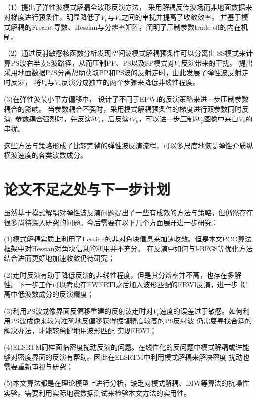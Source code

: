 （1）提出了弹性波模式解耦全波形反演方法，
采用解耦反传波场而非地面数据来对梯度进行预条件，明显降低了$V_p$与$V_s$之间的串扰并提高了收敛效率。
并基于模式解耦的Frechet导数、Hessian与分辨率矩阵，阐明了压制参数trade-off的内在机制。

（2）通过反射敏感核函数分析发现空间波模式解耦预条件可以分离出
SS模式来计算PS波右半支S波路径，从而压制PP、PS以及SP模式对$V_s$反演带来的干扰。
提出采用地面数据P/S分离帮助获取PP和PS波的反射走时，由此发展了弹性波反射走时反演，
将$V_p$与$V_s$反演分成独立的两个步骤来降低非线性程度。

(3)在弹性波最小平方偏移中，
设计了不同于EFWI的反演策略来进一步压制参数耦合的影响。
当参数耦合不强时，采用模式解耦预条件的梯度进行双参数同时反演;
参数耦合强烈时，先反演$\delta V_s$，后反演$\delta V_p$，可以进一步压制$\delta
V_p$图像中来自$V_s$的串扰。

这些方法与策略形成了比较完整的弹性波反演流程，可以多尺度地恢复弹性介质纵横波速度的各类波数成分。

\section{论文不足之处与下一步计划}
虽然基于模式解耦对弹性波反演问题提出了一些有成效的方法与策略，但仍然存在很多尚待深入研究的问题。今后需要在以下几个方面展开进一步研究：

(1)模式解耦实质上利用了Hessian的非对角块信息来加速收敛。但是本文PCG算法框架中对Hessian对角块信息的利用并不充分。
在反演中如何与l-BFGS等优化方法结合进而更好地加速收敛仍待研究；

(2)走时反演有助于降低反演的非线性程度，但是其分辨率并不高，也存在多解性。下一步工作可以考虑在EWERTI之后加入波形匹配的ERWI反演，进一步
提高中低波数成分的反演精度；

(3)利用PS波成像界面反偏移重建的反射波走时对$V_p$速度的误差过于敏感。如何利用PS波成像来较为准确地反偏移获得振幅精度较高的PS反射波
仍需要寻找合适的解决办法，才能较稳健地用波形匹配
实现ERWI；

(4)ELSRTM同样面临密度扰动反演的问题。在线性化的反问题中模式解耦或许能够对密度界面的反演有帮助。因此在ELSRTM中利用模式解耦来解决密度
扰动也需要重新审视与研究；

(5)本文算法都是在理论模型上进行分析，缺乏对模式解耦、DIW等算法的抗噪性实验。需要利用实际地震数据测试来检验本文方法的实用性。
